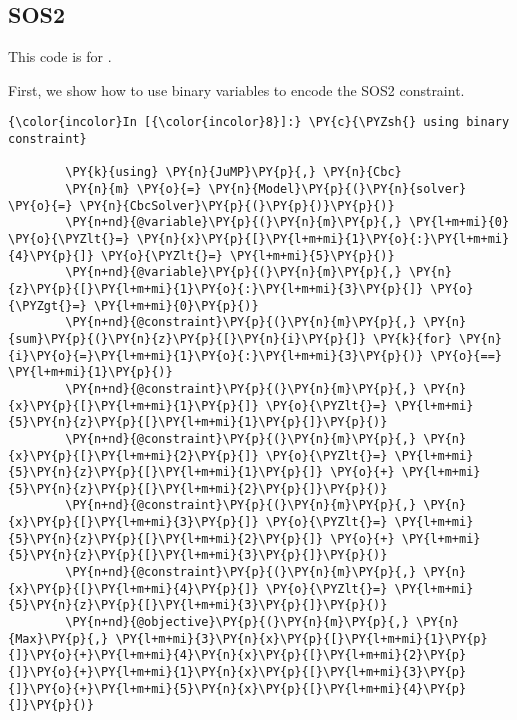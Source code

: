 \subsection{SOS2}


This code is for .

First, we show how to use binary variables to encode the SOS2 constraint.
\begin{codeCell}
\label{code:SOS2-binary}


    \begin{Verbatim}[commandchars=\\\{\}]
{\color{incolor}In [{\color{incolor}8}]:} \PY{c}{\PYZsh{} using binary constraint}
        
        \PY{k}{using} \PY{n}{JuMP}\PY{p}{,} \PY{n}{Cbc}
        \PY{n}{m} \PY{o}{=} \PY{n}{Model}\PY{p}{(}\PY{n}{solver} \PY{o}{=} \PY{n}{CbcSolver}\PY{p}{(}\PY{p}{)}\PY{p}{)}
        \PY{n+nd}{@variable}\PY{p}{(}\PY{n}{m}\PY{p}{,} \PY{l+m+mi}{0} \PY{o}{\PYZlt{}=} \PY{n}{x}\PY{p}{[}\PY{l+m+mi}{1}\PY{o}{:}\PY{l+m+mi}{4}\PY{p}{]} \PY{o}{\PYZlt{}=} \PY{l+m+mi}{5}\PY{p}{)}
        \PY{n+nd}{@variable}\PY{p}{(}\PY{n}{m}\PY{p}{,} \PY{n}{z}\PY{p}{[}\PY{l+m+mi}{1}\PY{o}{:}\PY{l+m+mi}{3}\PY{p}{]} \PY{o}{\PYZgt{}=} \PY{l+m+mi}{0}\PY{p}{)}
        \PY{n+nd}{@constraint}\PY{p}{(}\PY{n}{m}\PY{p}{,} \PY{n}{sum}\PY{p}{(}\PY{n}{z}\PY{p}{[}\PY{n}{i}\PY{p}{]} \PY{k}{for} \PY{n}{i}\PY{o}{=}\PY{l+m+mi}{1}\PY{o}{:}\PY{l+m+mi}{3}\PY{p}{)} \PY{o}{==} \PY{l+m+mi}{1}\PY{p}{)}
        \PY{n+nd}{@constraint}\PY{p}{(}\PY{n}{m}\PY{p}{,} \PY{n}{x}\PY{p}{[}\PY{l+m+mi}{1}\PY{p}{]} \PY{o}{\PYZlt{}=} \PY{l+m+mi}{5}\PY{n}{z}\PY{p}{[}\PY{l+m+mi}{1}\PY{p}{]}\PY{p}{)}
        \PY{n+nd}{@constraint}\PY{p}{(}\PY{n}{m}\PY{p}{,} \PY{n}{x}\PY{p}{[}\PY{l+m+mi}{2}\PY{p}{]} \PY{o}{\PYZlt{}=} \PY{l+m+mi}{5}\PY{n}{z}\PY{p}{[}\PY{l+m+mi}{1}\PY{p}{]} \PY{o}{+} \PY{l+m+mi}{5}\PY{n}{z}\PY{p}{[}\PY{l+m+mi}{2}\PY{p}{]}\PY{p}{)}
        \PY{n+nd}{@constraint}\PY{p}{(}\PY{n}{m}\PY{p}{,} \PY{n}{x}\PY{p}{[}\PY{l+m+mi}{3}\PY{p}{]} \PY{o}{\PYZlt{}=} \PY{l+m+mi}{5}\PY{n}{z}\PY{p}{[}\PY{l+m+mi}{2}\PY{p}{]} \PY{o}{+} \PY{l+m+mi}{5}\PY{n}{z}\PY{p}{[}\PY{l+m+mi}{3}\PY{p}{]}\PY{p}{)}
        \PY{n+nd}{@constraint}\PY{p}{(}\PY{n}{m}\PY{p}{,} \PY{n}{x}\PY{p}{[}\PY{l+m+mi}{4}\PY{p}{]} \PY{o}{\PYZlt{}=} \PY{l+m+mi}{5}\PY{n}{z}\PY{p}{[}\PY{l+m+mi}{3}\PY{p}{]}\PY{p}{)}
        \PY{n+nd}{@objective}\PY{p}{(}\PY{n}{m}\PY{p}{,} \PY{n}{Max}\PY{p}{,} \PY{l+m+mi}{3}\PY{n}{x}\PY{p}{[}\PY{l+m+mi}{1}\PY{p}{]}\PY{o}{+}\PY{l+m+mi}{4}\PY{n}{x}\PY{p}{[}\PY{l+m+mi}{2}\PY{p}{]}\PY{o}{+}\PY{l+m+mi}{1}\PY{n}{x}\PY{p}{[}\PY{l+m+mi}{3}\PY{p}{]}\PY{o}{+}\PY{l+m+mi}{5}\PY{n}{x}\PY{p}{[}\PY{l+m+mi}{4}\PY{p}{]}\PY{p}{)}
        

\end{Verbatim}
\end{codeCell}
